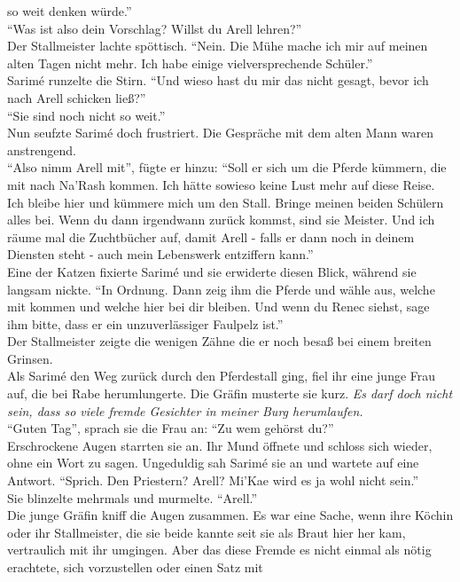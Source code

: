 so weit denken würde.''\\
``Was ist also dein Vorschlag? Willst du Arell lehren?''\\
Der Stallmeister lachte spöttisch. ``Nein. Die Mühe mache ich mir auf meinen alten Tagen nicht 
mehr. Ich habe einige vielversprechende Schüler.''\\
Sarimé runzelte die Stirn. ``Und wieso hast du mir das nicht gesagt, bevor ich nach Arell schicken 
ließ?''\\
``Sie sind noch nicht so weit.''\\
Nun seufzte Sarimé doch frustriert. Die Gespräche mit dem alten Mann waren anstrengend.\\
``Also nimm Arell mit'', fügte er hinzu: ``Soll er sich um die Pferde kümmern, die mit nach Na'Rash 
kommen. Ich hätte sowieso keine Lust mehr auf diese Reise. Ich bleibe hier und kümmere mich um den 
Stall. Bringe meinen beiden Schülern alles bei. Wenn du dann irgendwann zurück kommst, sind sie 
Meister. Und ich räume mal die Zuchtbücher auf, damit Arell - falls er dann noch in deinem Diensten 
steht - auch mein Lebenswerk entziffern kann.''\\
Eine der Katzen fixierte Sarimé und sie erwiderte diesen Blick, während sie langsam nickte. ``In 
Ordnung. Dann zeig ihm die Pferde und wähle aus, welche mit kommen und welche hier bei dir bleiben. 
Und wenn du Renec siehst, sage ihm bitte, dass er ein unzuverlässiger Faulpelz ist.''\\
Der Stallmeister zeigte die wenigen Zähne die er noch besaß bei einem breiten Grinsen.\\
Als Sarimé den Weg zurück durch den Pferdestall ging, fiel ihr eine junge Frau auf, die bei Rabe 
herumlungerte. Die Gräfin musterte sie kurz. \textit{Es darf doch nicht sein, dass so viele fremde 
Gesichter in meiner Burg herumlaufen.}\\
``Guten Tag'', sprach sie die Frau an: ``Zu wem gehörst du?''\\
Erschrockene Augen starrten sie an. Ihr Mund öffnete und schloss sich wieder, ohne ein Wort 
zu sagen. Ungeduldig sah Sarimé sie an und wartete auf eine Antwort. ``Sprich. Den Priestern? 
Arell? Mi'Kae wird es ja wohl nicht sein.''\\
Sie blinzelte mehrmals und murmelte. ``Arell.''\\
Die junge Gräfin kniff die Augen zusammen. Es war eine Sache, wenn ihre Köchin oder ihr 
Stallmeister, die sie beide kannte seit sie als Braut hier her kam, vertraulich mit ihr umgingen. 
Aber das diese Fremde es nicht einmal als nötig erachtete, sich vorzustellen oder einen Satz mit 
